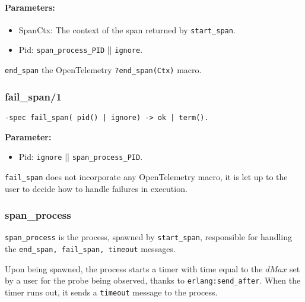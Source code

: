             \paragraph{Parameters:}
            \begin{itemize}
                \item SpanCtx: The context of the span returned by \texttt{start\_span}.
                \item Pid: \texttt{span\_process\_PID} || \texttt{ignore}.
            \end{itemize}

   \texttt{end\_span} the OpenTelemetry \texttt{?end\_span(Ctx)} macro. \\

        \subsubsection{fail\_span/1}
        \begin{verbatim}        
-spec fail_span( pid() | ignore) -> ok | term().
        \end{verbatim}

        \textbf{Parameter:}
             \begin{itemize}
                \item Pid: \texttt{ignore} || \texttt{span\_process\_PID}.
            \end{itemize}
            \texttt{fail\_span} does not incorporate any OpenTelemetry macro, it is let up to the user to decide how to handle failures in execution.
        \subsubsection{span\_process}
            \texttt{span\_process} is the process, spawned by \texttt{start\_span}, responsible for handling the \texttt{end\_span, fail\_span, timeout} messages.

            Upon being spawned, the process starts a timer with time equal to the $dMax$ set by a user for the probe being observed, thanks to \texttt{erlang:send\_after}. When the timer runs out, it sends a \texttt{timeout} message to the process.
        
